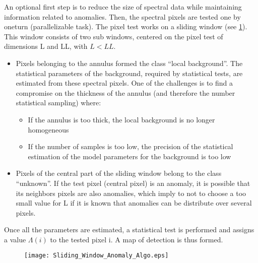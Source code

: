 An optional first step is to reduce the size of spectral data
while maintaining information related to anomalies. Then, the spectral pixels
are tested one by oneturn (parallelizable task). The pixel
test works on a sliding window (see \ref{fig:sliding_anomaly}). This
window consists of two sub windows, centered on the pixel test of  dimensions L and LL, with $L<LL$.

\begin{itemize}
\item Pixels belonging to the annulus formed the class ``local background''. The statistical parameters of the background,
  required by statistical tests, are estimated from these
  spectral pixels. One of the challenges is to find a
  compromise on the thickness of the annulus (and therefore the number
  statistical sampling) where:
 
\begin{itemize}
\item If the annulus is too thick, the local background  is no longer homogeneous
\item If the number of samples is too low, the precision of
  the statistical estimation of the model parameters for the background is too
  low
\end{itemize}  
\item Pixels of the central part of the sliding window
  belong to the class ``unknown''. If the test pixel (central pixel) is an anomaly, it is possible that its neighbors
  pixels are also anomalies, which imply to not to choose
  a too small value for L if it is known that anomalies
  can be distribute over several pixels.
\end{itemize}  
Once all the parameters are estimated, a statistical test is performed and assigns a
value $\Lambda(i)$ to the tested pixel i. A map of detection is thus
formed.

\begin{figure}[h]
  \centering
  \texttt{[image: Sliding\_Window\_Anomaly\_Algo.eps]}
  \label{fig:sliding_anomaly}
\end{figure}

